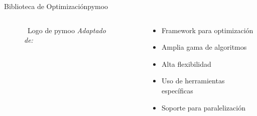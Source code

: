 \begin{frame}{Biblioteca de Optimización}{pymoo}
    \begin{columns}
        \begin{column}{0.4\textwidth}
            \centering
            \begin{figure}[H]
                \centering
                \vspace{-0.25cm}
                \caption{\tiny~Logo de pymoo \textit{Adaptado de:}~\cite{blank2020}}%
                \label{fig:pymoo_logo}
            \end{figure}
        \end{column}
        \begin{column}{0.6\textwidth}
            \begin{itemize}
                \small
                \item Framework para optimización
                \item Amplia gama de algoritmos
                \item Alta flexibilidad
                \item Uso de herramientas específicas
                \item Soporte para paralelización
            \end{itemize}
        \end{column}
    \end{columns}
\end{frame}

